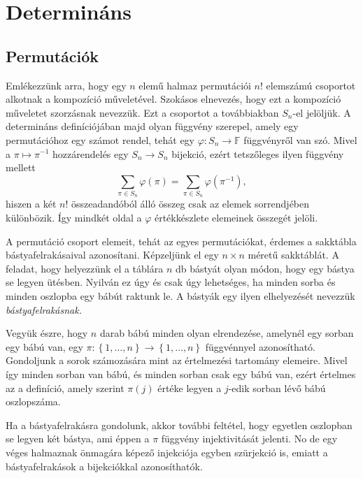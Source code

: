 \documentclass[9pt, a4paper, showtrims]{memoir}
\theoremstyle{plain}
\theoremstyle{remark}
\theoremstyle{definition}
\begin{document}
\chapter{Determináns}

\section{Permutációk}

Emlékezzünk arra,
hogy egy $n$ elemű halmaz permutációi $n!$ elemszámú csoportot alkotnak a kompozíció műveletével. 
Szokásos elnevezés, hogy ezt a kompozíció műveletet szorzásnak nevezzük.
Ezt a csoportot a továbbiakban $S_{n}$-el jelöljük.
A determináns definíciójában majd olyan függvény szerepel, 
amely egy permutációhoz egy számot rendel, 
tehát egy $\varphi:S_n\to\mathbb{F}$ függvényről van szó.
Mivel a $\pi\mapsto \pi^{-1}$ hozzárendelés egy $S_n\to S_n$ bijekció,
ezért tetszőleges ilyen függvény mellett
\[
    \sum_{\pi\in S_n}\varphi\left( \pi \right)=
    \sum_{\pi\in S_n}\varphi\left( \pi^{-1} \right),
\]
hiszen a két $n!$ összeadandóból álló összeg csak az elemek sorrendjében különbözik. 
Így mindkét oldal a $\varphi$ értékkészlete elemeinek összegét jelöli.

A permutáció csoport elemeit, 
tehát az egyes permutációkat,
érdemes a sakktábla bástyafelrakásaival azonosítani.
Képzeljünk el egy $n\times n$ méretű sakktáblát. 
A feladat, hogy helyezzünk el a táblára $n$ db bástyát olyan módon, 
hogy egy bástya se legyen ütésben.
Nyilván ez úgy és csak úgy lehetséges, 
ha minden sorba és minden oszlopba egy bábút raktunk le. 
A bástyák egy ilyen elhelyezését nevezzük \emph{bástyafelrakásnak.}

Vegyük észre, hogy $n$ darab bábú minden olyan elrendezése, 
amelynél egy sorban egy bábú van, egy 
\begin{math}
    \pi:\left\{ 1,\dots,n \right\} \to \left\{ 1,\dots,n \right\}
\end{math}
függvénnyel azonosítható. 
Gondoljunk a sorok számozására mint az értelmezési tartomány elemeire.
Mivel így minden sorban van bábú, 
és minden sorban csak egy bábú van,
ezért értelmes az a definíció,
amely szerint  $\pi\left( j \right)$ értéke legyen a $j$-edik sorban lévő bábú oszlopszáma.

Ha a bástyafelrakásra gondolunk,
akkor további feltétel, 
hogy egyetlen oszlopban se legyen két bástya, 
ami éppen a $\pi$ függvény injektivitását jelenti. 
No de egy véges halmaznak önmagára képező injekciója egyben szürjekció is, 
emiatt a bástyafelrakások a bijekciókkal azonosíthatók.
\end{document}
